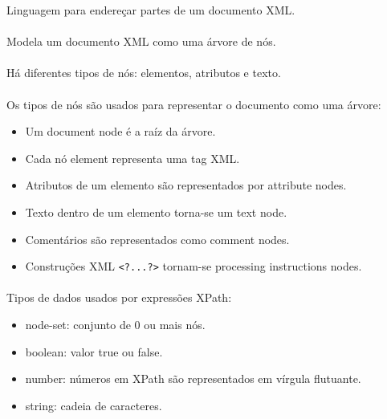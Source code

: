 \documentclass[../resumosLTW.tex]{subfiles}
\begin{document}
 

Linguagem para endereçar partes de um documento XML.

\paragraph{}

Modela um documento XML como uma árvore de nós.

\paragraph{}

Há diferentes tipos de nós: elementos, atributos e texto.

\paragraph{}

Os tipos de nós são usados para representar o documento como uma árvore:
\begin{itemize}
    \item Um document node é a raíz da árvore.
    \item Cada nó element representa uma tag XML.
    \item Atributos de um elemento são representados por attribute nodes.
    \item Texto dentro de um elemento torna-se um text node.
    \item Comentários são representados como comment nodes.
    \item Construções XML \lstinline{<?...?>} tornam-se processing instructions nodes.
\end{itemize}

\paragraph{}

Tipos de dados usados por expressões XPath:
\begin{itemize}
    \item node-set: conjunto de 0 ou mais nós.
    \item boolean: valor true ou false.
    \item number: números em XPath são representados em vírgula flutuante.
    \item string: cadeia de caracteres.
\end{itemize}

\paragraph{}
\end{document}
